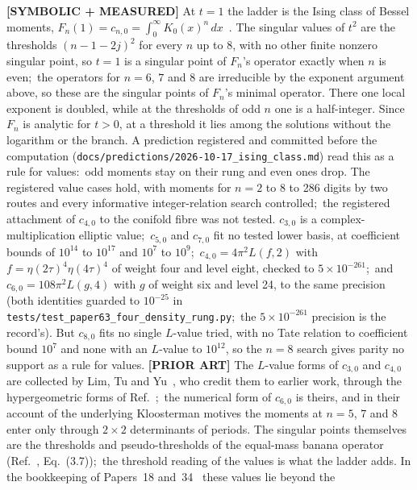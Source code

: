 \documentclass[aps,pra,twocolumn,superscriptaddress,longbibliography]{revtex4-2}
\begin{document}
\textbf{[SYMBOLIC + MEASURED]} At $t=1$ the ladder is the Ising class of
Bessel moments, $F_n(1)=c_{n,0}=\int_0^\infty K_0(x)^n\,dx$~\cite{bbbg2008}.
The singular values of $t^2$ are the thresholds $(n-1-2j)^2$ for every $n$
up to $8$, with no other finite nonzero singular point, so $t=1$ is a singular point
of $F_n$'s operator exactly when $n$ is even;\ the operators for $n=6$, $7$
and $8$ are irreducible by the exponent argument above, so these are the
singular points of $F_n$'s minimal operator.  There one local exponent is
doubled, while at the thresholds of odd $n$ one is a half-integer.  Since
$F_n$ is analytic for $t>0$, at a threshold it lies among the solutions
without the logarithm or the branch.  A prediction registered and committed before the
computation (\texttt{docs/predictions/2026-10-17\_ising\_class.md}) read
this as a rule for values:\ odd moments stay on their rung and even ones
drop.  The registered value cases hold, with moments for $n=2$ to $8$ to
286 digits by two routes and every informative integer-relation search
controlled;\ the registered attachment of $c_{4,0}$ to the conifold fibre
was not tested.  $c_{3,0}$ is a complex-multiplication elliptic value;\
$c_{5,0}$ and $c_{7,0}$ fit no tested lower basis, at coefficient bounds
of $10^{14}$ to $10^{17}$ and $10^{7}$ to $10^{9}$;\
$c_{4,0}=4\pi^2L(f,2)$ with $f=\eta(2\tau)^4\eta(4\tau)^4$ of weight four
and level eight, checked to $5\times10^{-261}$;\ and
$c_{6,0}=108\pi^2L(g,4)$ with $g$ of weight six and level 24, to the same
precision (both identities guarded to $10^{-25}$ in
\texttt{tests/test\_paper63\_four\_density\_rung.py};\ the $5\times10^{-261}$
precision is the record's).  But $c_{8,0}$ fits no single $L$-value tried, with no Tate
relation to coefficient bound $10^7$ and none with an $L$-value to
$10^{12}$, so the $n=8$ search gives parity no support as a rule for values.  \textbf{[PRIOR ART]} The $L$-value forms of $c_{3,0}$ and $c_{4,0}$ are
collected by Lim, Tu and Yu~\cite{lim_tu_yu2026}, who credit them to earlier
work, through the hypergeometric forms of Ref.~\cite{bbbg2008};\ the
numerical form of $c_{6,0}$ is theirs, and in their account of the
underlying Kloosterman motives the moments at $n=5$, $7$ and $8$ enter
only through $2\times2$ determinants of periods.  The singular points themselves are the
thresholds and pseudo-thresholds of the equal-mass banana operator
(Ref.~\cite{bonisch2021}, Eq.~(3.7));\ the threshold reading of the
values is what the ladder adds.  In the bookkeeping of Papers~18
and~34~\cite{loutey_paper18,loutey_paper34} these values lie beyond the
\end{document}
